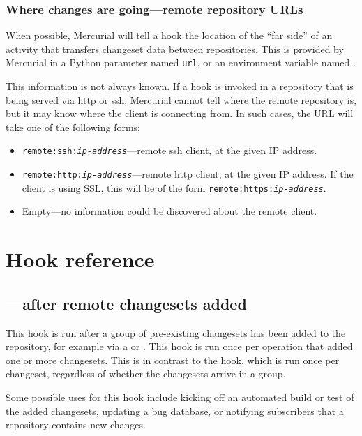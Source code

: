 \subsubsection{Where changes are going---remote repository URLs}
\label{sec:hook:url}

When possible, Mercurial will tell a hook the location of the ``far
side'' of an activity that transfers changeset data between
repositories.  This is provided by Mercurial in a Python parameter
named \texttt{url}, or an environment variable named .

This information is not always known.  If a hook is invoked in a
repository that is being served via http or ssh, Mercurial cannot tell
where the remote repository is, but it may know where the client is
connecting from.  In such cases, the URL will take one of the
following forms:
\begin{itemize}
\item \texttt{remote:ssh:\emph{ip-address}}---remote ssh client, at
  the given IP address.
\item \texttt{remote:http:\emph{ip-address}}---remote http client, at
  the given IP address.  If the client is using SSL, this will be of
  the form \texttt{remote:https:\emph{ip-address}}.
\item Empty---no information could be discovered about the remote
  client.
\end{itemize}

\section{Hook reference}

\subsection{---after remote changesets added}
\label{sec:hook:changegroup}

This hook is run after a group of pre-existing changesets has been
added to the repository, for example via a  or
.  This hook is run once per operation that added one
or more changesets.  This is in contrast to the  hook,
which is run once per changeset, regardless of whether the changesets
arrive in a group.

Some possible uses for this hook include kicking off an automated
build or test of the added changesets, updating a bug database, or
notifying subscribers that a repository contains new changes.

